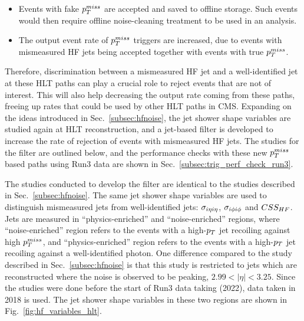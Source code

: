 \begin{itemize}
    \item Events with fake $p_T^{miss}$ are accepted and saved to offline storage. Such events would then require offline noise-cleaning treatment to be used in an analysis.
    \item The output event rate of $p_T^{miss}$ triggers are increased, due to events with mismeasured HF jets being accepted together with events with true $p_T^{miss}$.
\end{itemize}

Therefore, discrimination between a mismeasured HF jet and a well-identified jet at these HLT paths can play a crucial role to reject events that are not of interest.
This will also help decreasing the output rate coming from these paths, freeing up rates that could be used by other HLT paths in CMS. Expanding on the ideas introduced
in Sec.~\ref{subsec:hfnoise}, the jet shower shape variables are studied again at HLT reconstruction, and a jet-based filter is developed to increase the 
rate of rejection of events with mismeasured HF jets. The studies for the filter are outlined below, and the performance checks with these new $p_T^{miss}$ based paths
using Run3 data are shown in Sec.~\ref{subsec:trig_perf_check_run3}.

The studies conducted to develop the filter are identical to the studies described in Sec.~\ref{subsec:hfnoise}. 
The same jet shower shape variables are used to distinguish mismeasured jets from well-identified jets: $\sigma_{i\eta i\eta}$, $\sigma_{i\phi i\phi}$ and $CSS_{HF}$. 
Jets are measured in ``physics-enriched'' and ``noise-enriched'' regions, where ``noise-enriched'' region refers to the events with a high-$p_T$ jet
recoiling against high $p_T^{miss}$, and ``physics-enriched'' region refers to the events with a high-$p_T$ jet recoiling against a well-identified photon.
One difference compared to the study described in Sec.~\ref{subsec:hfnoise} is that this study is restricted to jets which are reconstructed where the
noise is observed to be peaking, $2.99 < |\eta| < 3.25$. Since the studies were done before the start of Run3 data taking (2022), data taken in 2018 is used.
The jet shower shape variables in these two regions are shown in Fig.~\ref{fig:hf_variables_hlt}.

